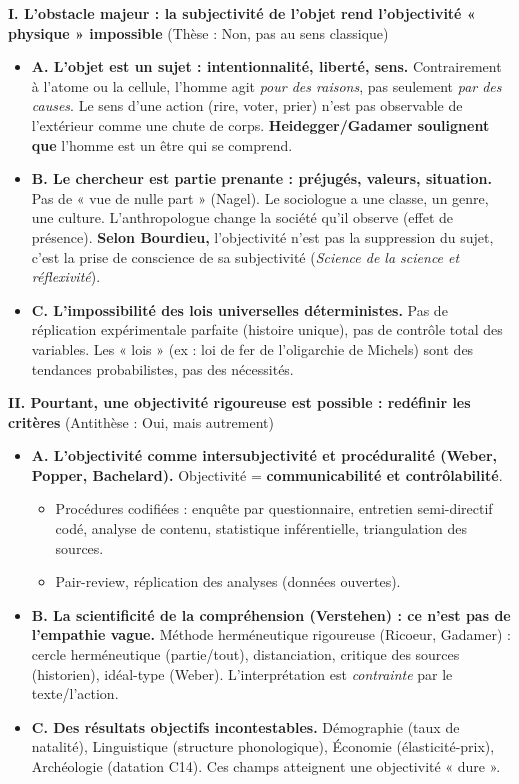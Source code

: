 \documentclass[11pt]{article}
\begin{document}
\begin{exoresolu}
    \textbf{I. L'obstacle majeur : la subjectivité de l'objet rend l'objectivité « physique » impossible} (Thèse : Non, pas au sens classique)
    \begin{itemize}
        \item \textbf{A. L'objet est un sujet : intentionnalité, liberté, sens.} Contrairement à l'atome ou la cellule, l'homme agit \emph{pour des raisons}, pas seulement \emph{par des causes}. Le sens d'une action (rire, voter, prier) n'est pas observable de l'extérieur comme une chute de corps. \textbf{Heidegger/Gadamer soulignent que} l'homme est un être qui se comprend.
        \item \textbf{B. Le chercheur est partie prenante : préjugés, valeurs, situation.} Pas de « vue de nulle part » (Nagel). Le sociologue a une classe, un genre, une culture. L'anthropologue change la société qu'il observe (effet de présence). \textbf{Selon Bourdieu,} l'objectivité n'est pas la suppression du sujet, c'est la prise de conscience de sa subjectivité (\emph{Science de la science et réflexivité}).
        \item \textbf{C. L'impossibilité des lois universelles déterministes.} Pas de réplication expérimentale parfaite (histoire unique), pas de contrôle total des variables. Les « lois » (ex : loi de fer de l'oligarchie de Michels) sont des tendances probabilistes, pas des nécessités.
    \end{itemize}

    \textbf{II. Pourtant, une objectivité rigoureuse est possible : redéfinir les critères} (Antithèse : Oui, mais autrement)
    \begin{itemize}
        \item \textbf{A. L'objectivité comme intersubjectivité et procéduralité (Weber, Popper, Bachelard).} Objectivité = \textbf{communicabilité et contrôlabilité}.
        \begin{itemize}
            \item Procédures codifiées : enquête par questionnaire, entretien semi-directif codé, analyse de contenu, statistique inférentielle, triangulation des sources.
            \item Pair-review, réplication des analyses (données ouvertes).
        \end{itemize}
        \item \textbf{B. La scientificité de la compréhension (Verstehen) : ce n'est pas de l'empathie vague.} Méthode herméneutique rigoureuse (Ricoeur, Gadamer) : cercle herméneutique (partie/tout), distanciation, critique des sources (historien), idéal-type (Weber). L'interprétation est \emph{contrainte} par le texte/l'action.
        \item \textbf{C. Des résultats objectifs incontestables.} Démographie (taux de natalité), Linguistique (structure phonologique), Économie (élasticité-prix), Archéologie (datation C14). Ces champs atteignent une objectivité « dure ».
    \end{itemize}


\end{exoresolu}
\end{document}
